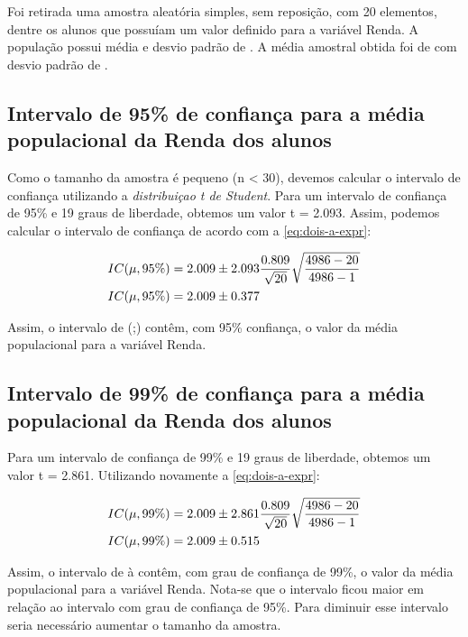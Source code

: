 
Foi retirada uma amostra aleatória simples, sem reposição, com 20 elementos,
dentre os \TRESN alunos que possuíam um valor definido para a variável Renda.
A população possui média \TRESX e desvio padrão de \TRESSD.
A média amostral obtida foi de \TRESx com desvio padrão de \TRESsd.

\subsection{Intervalo de 95\% de confiança para a média populacional da Renda dos alunos}
Como o tamanho da amostra é pequeno (n < 30), devemos calcular o intervalo
de confiança utilizando a \textit{distribuiçao t de Student}. Para um intervalo
de confiança de 95\% e 19 graus de liberdade, obtemos um valor t = 2.093.
Assim, podemos calcular o intervalo de confiança de acordo com a \autoref{eq:dois-a-expr}:

\begin{align*}
	IC (\mu, 95\%) &= 2.009 \pm 2.093 \frac{0.809}{\sqrt{20}} \sqrt{\frac{4986 - 20}{4986 - 1}} \\
	IC (\mu, 95\%) &= 2.009 \pm 0.377
\end{align*}

Assim, o intervalo de (\TRESicmin;\TRESicmax) contêm, com 95\% confiança, o
valor da média populacional para a variável Renda.

\subsection{Intervalo de 99\% de confiança para a média populacional da Renda dos alunos}
Para um intervalo de confiança de 99\% e 19 graus de liberdade, obtemos um valor t = 2.861.
Utilizando novamente a \autoref{eq:dois-a-expr}:

\begin{align*}
	IC (\mu, 99\%) &= 2.009 \pm 2.861 \frac{0.809}{\sqrt{20}} \sqrt{\frac{4986 - 20}{4986 - 1}} \\
	IC (\mu, 99\%) &= 2.009 \pm 0.515
\end{align*}

Assim, o intervalo de \TRESicNoveNoveMin à \TRESicNoveNoveMax contêm, com grau de confiança de 99\%, o valor
da média populacional para a variável Renda. Nota-se que o intervalo ficou maior em relação ao intervalo com grau de confiança de 95\%. Para diminuir esse intervalo seria necessário aumentar o tamanho da amostra.

